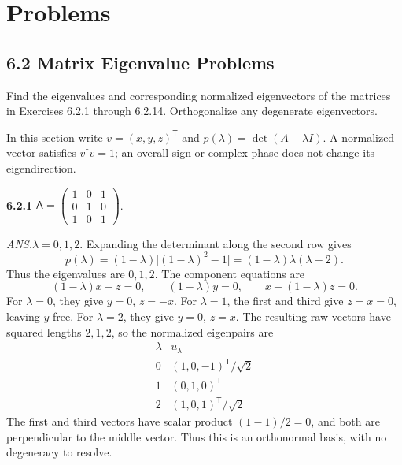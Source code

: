 
\section*{Problems}

\subsection*{6.2 Matrix Eigenvalue Problems}

Find the eigenvalues and corresponding normalized eigenvectors of the
matrices in Exercises 6.2.1 through 6.2.14. Orthogonalize any degenerate
eigenvectors.

In this section write $v=(x,y,z)^{\mathsf T}$ and
$p(\lambda)=\det(A-\lambda I)$. A normalized vector satisfies
$v^\dagger v=1$; an overall sign or complex phase does not change its
eigendirection.

\par\bigskip
\noindent\textbf{6.2.1}\quad
$\mathsf{A}=\begin{pmatrix}1&0&1\\0&1&0\\1&0&1\end{pmatrix}$.
\par\nobreak\hfill\emph{ANS.}\enspace $\lambda=0,1,2$.
\solution
Expanding the determinant along the second row gives
\[
p(\lambda)=(1-\lambda)\bigl[(1-\lambda)^2-1\bigr]
=(1-\lambda)\lambda(\lambda-2).
\]
Thus the eigenvalues are $0,1,2$. The component equations are
\[
(1-\lambda)x+z=0,\qquad(1-\lambda)y=0,\qquad
x+(1-\lambda)z=0.
\]
For $\lambda=0$, they give $y=0$, $z=-x$. For $\lambda=1$, the first
and third give $z=x=0$, leaving $y$ free. For $\lambda=2$, they give
$y=0$, $z=x$. The resulting raw vectors have squared lengths $2,1,2$,
so the normalized eigenpairs are
\[
\boxed{\begin{array}{c|c}
\lambda&u_\lambda\\\hline
0&(1,0,-1)^{\mathsf T}/\sqrt2\\
1&(0,1,0)^{\mathsf T}\\
2&(1,0,1)^{\mathsf T}/\sqrt2
\end{array}}
\]
The first and third vectors have scalar product $(1-1)/2=0$, and
both are perpendicular to the middle vector. Thus this is an orthonormal
basis, with no degeneracy to resolve.

